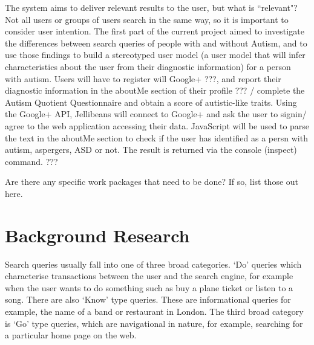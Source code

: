 \documentclass[a4paper, 11pt]{article}
\begin{document}
The system aims to deliver relevant results to the user, but what is ``relevant"? Not all users or groups of users search in the same way, so it is important to consider user intention. The first part of the current project aimed to investigate the differences between search queries of people with and without Autism, and to use those findings to build a stereotyped user model (a user model that will infer characteristics about the user from their diagnostic information) for a person with autism. Users will have to register will Google+ ???, and report their diagnostic information in the aboutMe section of their profile ??? / complete the Autism Quotient Questionnaire and obtain a score of autistic-like traits. Using the Google+ API, Jellibeans will connect to Google+ and ask the user to signin/ agree to the web application accessing their data. JavaScript will be used to parse the text in the aboutMe section to check if the user has identified as a persn with autism, aspergers, ASD or not. The result is returned via the console (inspect) command. ??? 

Are there any specific work packages that need to be done? If so, list those out here.

\section {Background Research}\label{background} 

Search queries usually fall into one of three broad categories.  `Do' queries which characterise transactions between the user and the search engine, for example when the user wants to do something such as buy a plane ticket or listen to a song. There are also `Know' type queries. These are informational queries for example, the name of a band or restaurant in London. The third broad category is `Go' type queries, which are navigational in nature, for example, searching for a particular home page on the web. 
\end{document}
